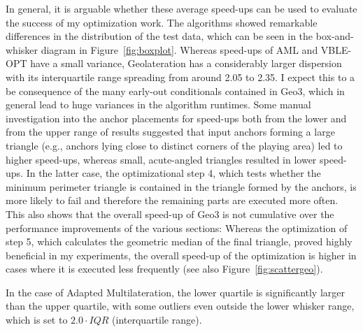 In general, it is arguable whether these average speed-ups can be used to evaluate the success of my optimization work. The algorithms showed remarkable differences in the distribution of the test data, which can be seen in the box-and-whisker diagram in Figure~\ref{fig:boxplot}. Whereas speed-ups of AML and VBLE-OPT have a small variance, Geolateration has a considerably larger dispersion with its interquartile range spreading from around 2.05 to 2.35. I expect this to a be consequence of the many early-out conditionals contained in Geo3, which in general lead to huge variances in the algorithm runtimes. Some manual investigation into the anchor placements for speed-ups both from the lower and from the upper range of results suggested that input anchors forming a large triangle (e.g., anchors lying close to distinct corners of the playing area) led to higher speed-ups, whereas small, acute-angled triangles resulted in lower speed-ups. In the latter case, the optimizational step 4, which tests whether the minimum perimeter triangle is contained in the triangle formed by the anchors, is more likely to fail and therefore the remaining parts are executed more often. This also shows that the overall speed-up of Geo3 is not cumulative over the performance improvements of the various sections: Whereas the optimization of step 5, which calculates the geometric median of the final triangle, proved highly beneficial in my experiments, the overall speed-up of the optimization is higher in cases where it is executed less frequently (see also Figure~\ref{fig:scattergeo}).

In the case of Adapted Multilateration, the lower quartile is significantly larger than the upper quartile, with some outliers even outside the lower whisker range, which is set to $2.0 \cdot IQR$ (interquartile range). 

